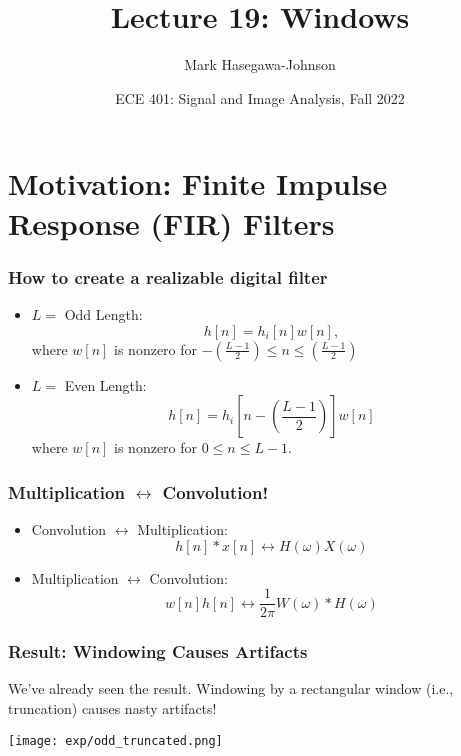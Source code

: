 \documentclass{beamer}
\title{Lecture 19: Windows}
\author{Mark Hasegawa-Johnson}
\date{ECE 401: Signal and Image Analysis, Fall 2022}
\begin{document}
\begin{frame}
  \maketitle
\end{frame}

\begin{frame}
  \tableofcontents
\end{frame}

\section[Motivation]{Motivation: Finite Impulse Response (FIR) Filters}
\setcounter{subsection}{1}

\begin{frame}
  \frametitle{How to create a realizable digital filter}
  \begin{itemize}
  \item $L=$ Odd Length:
    \[
    h[n] = h_{i}[n]w[n],
    \]
    where $w[n]$ is nonzero for $-\left(\frac{L-1}{2}\right)\le n\le
    \left(\frac{L-1}{2}\right)$
  \item $L=$ Even Length:
    \[
    h[n] = h_{i}\left[n-\left(\frac{L-1}{2}\right)\right]w[n]
    \]
    where $w[n]$ is nonzero for $0\le n\le L-1$.
  \end{itemize}
\end{frame}

\begin{frame}
  \frametitle{Multiplication $\leftrightarrow$ Convolution!}

  \begin{itemize}
  \item Convolution $\leftrightarrow$ Multiplication:
    \begin{displaymath}
      h[n] \ast x[n] \leftrightarrow H(\omega)X(\omega)
    \end{displaymath}
  \item Multiplication $\leftrightarrow$ Convolution:
    \begin{displaymath}
      w[n]h[n] \leftrightarrow \frac{1}{2\pi}W(\omega)\ast H(\omega)
    \end{displaymath}
  \end{itemize}
\end{frame}

\begin{frame}
  \frametitle{Result: Windowing Causes Artifacts}

  We've already seen the result.  Windowing by a rectangular window
  (i.e., truncation) causes nasty artifacts!

  \centerline{\texttt{[image: exp/odd\_truncated.png]}}
\end{frame}
\end{document}
